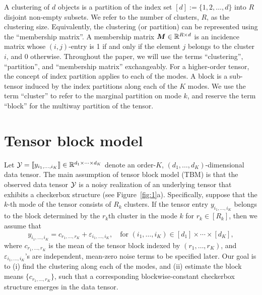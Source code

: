 \documentclass{article}
\begin{document}
A clustering of $d$ objects is a partition of the index set $[d]:=\{1,2,\ldots,d\}$ into $R$ disjoint non-empty subsets. We refer to the number of clusters, $R$, as the clustering size. Equivalently, the clustering (or partition) can be represented using the ``membership matrix''. A membership matrix $\boldsymbol{M}\in\mathbb{R}^{R\times d}$ is an incidence matrix whose $(i,j)$-entry is 1 if and only if the element $j$ belongs to the cluster $i$, and 0 otherwise. Throughout the paper, we will use the terms ``clustering'', ``partition'', and ``membership matrix'' exchangeably. For a higher-order tensor, the concept of index partition applies to each of the modes. A block is a sub-tensor induced by the index partitions along each of the $K$ modes. We use the term ``cluster'' to refer to the marginal partition on mode $k$, and reserve the term ``block'' for the multiway partition of the tensor. 



\section{Tensor block model}
\vspace{-.1cm}
Let $\mathcal{Y}=\llbracket y_{i_1,\ldots,i_K} \rrbracket\in\mathbb{R}^{d_1\times \cdots\times d_K}$ denote an order-$K$, $(d_1,\ldots,d_K)$-dimensional data tensor. The main assumption of tensor block model (TBM) is that the observed data tensor $\mathcal{Y}$ is a noisy realization of an underlying tensor that exhibits a checkerbox structure (see Figure~\ref{fig:1}a). Specifically, suppose that the $k$-th mode of the tensor consists of $R_k$ clusters. If the tensor entry $y_{i_1,\ldots,i_K}$ belongs to the block determined by the $r_k$th cluster in the mode $k$ for $r_k\in[R_k]$, then we assume that 
\begin{equation}\label{eq:model}
y_{i_1,\ldots,i_K}=c_{r_1,\ldots,r_K}+\varepsilon_{i_1,\ldots,i_K},\quad \text{for }(i_1,\ldots,i_K)\in[d_1]\times\cdots\times [d_K],
\end{equation}
where $c_{r_1,\ldots,r_K}$ is the mean of the tensor block indexed by $(r_1,\ldots,r_K)$,  and $\varepsilon_{i_1,\ldots,i_K}$'s are independent, mean-zero noise terms to be specified later. Our goal is to (i) find the clustering along each of the modes, and (ii) estimate the block means $\{c_{r_1,\ldots,r_K}\}$, such that a corresponding blockwise-constant checkerbox structure emerges in the data tensor. 
\end{document}
